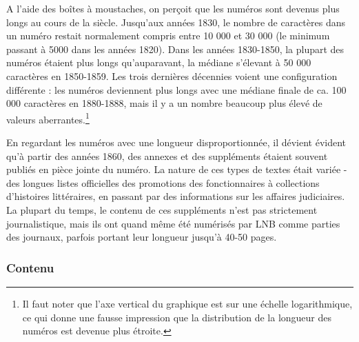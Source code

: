 \documentclass[a4paper,twoside,12pt]{article}
\begin{document}
\clearpage

A l'aide des boîtes à moustaches, on perçoit que les numéros sont devenus plus longs au cours de la siècle. Jusqu'aux années 1830, le nombre de caractères dans un numéro restait normalement compris entre 10 000 et 30 000 (le minimum passant à 5000 dans les années 1820). Dans les années 1830-1850, la plupart des numéros étaient plus longs qu'auparavant, la médiane s'élevant à 50 000 caractères en 1850-1859. Les trois dernières décennies voient une configuration différente : les numéros deviennent plus longs avec une médiane finale de ca. 100 000 caractères en 1880-1888, mais il y a un nombre beaucoup plus élevé de valeurs aberrantes.\footnote{Il faut noter que l'axe vertical du graphique est sur une échelle logarithmique, ce qui donne une fausse impression que la distribution de la longueur des numéros est devenue plus étroite.}

En regardant les numéros avec une longueur disproportionnée, il dévient évident qu'à partir des années 1860, des annexes et des suppléments étaient souvent publiés en pièce jointe du numéro. La nature de ces types de textes était variée - des longues listes officielles des promotions des fonctionnaires à collections d'histoires littéraires, en passant par des informations sur les affaires judiciaires. La plupart du temps, le contenu de ces suppléments n'est pas strictement journalistique, mais ils ont quand même été numérisés par LNB comme parties des journaux, parfois portant leur longueur jusqu'à 40-50 pages.


\subsubsection{Contenu} \label{contenu}
\end{document}
